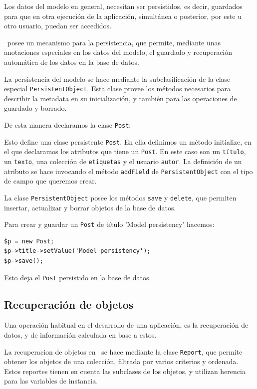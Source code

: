 Los datos del modelo en general, necesitan ser persistidos, es decir, guardados para que en otra ejecución de la aplicación, simultánea o posterior, por este u otro usuario, puedan ser accedidos.

\PWB \ posee un mecanismo para la persistencia, que permite, mediante unas anotaciones especiales en los datos del modelo, el guardado y recuperación automática de los datos en la base de datos.

La persistencia del modelo se hace mediante la subclasificación de la clase especial \verb"PersistentObject". Esta clase provee los métodos necesarios para describir la metadata en su inicialización, y también para las operaciones de guardado y borrado.

De esta manera declaramos la clase \verb"Post":

\begin{lgrind}

\end{lgrind}

Esto define una clase persistente \verb"Post". En ella definimos un método initialize, en el que declaramos los atributos que tiene un \verb"Post". En este caso son un \verb"título", un \verb"texto", una colección de \verb"etiquetas" y el usuario \verb"autor". La definición de un atributo se hace invocando el método \verb"addField" de \verb"PersistentObject" con el tipo de campo que queremos crear.

La clase \verb'PersistentObject' posee los métodos \verb'save' y \verb'delete', que permiten insertar, actualizar y borrar objetos de la base de datos.

Para crear y guardar un \verb'Post' de título 'Model persistency' hacemos:

\begin{verbatim}
$p = new Post;
$p->title->setValue('Model persistency');
$p->save();
\end{verbatim}

Esto deja el \verb'Post' persistido en la base de datos.

\subsection{Recuperación de objetos}

Una operación habitual en el desarrollo de una aplicación, es la recuperación de datos, y de información calculada en base a estos.

La recuperacion de objetos en \PWB \ se hace mediante la clase \verb"Report", que permite obtener los objetos de una colección, filtrada por varios criterios y ordenada. Estos reportes tienen en cuenta las subclases de los objetos, y utilizan herencia para las variables de instancia.

